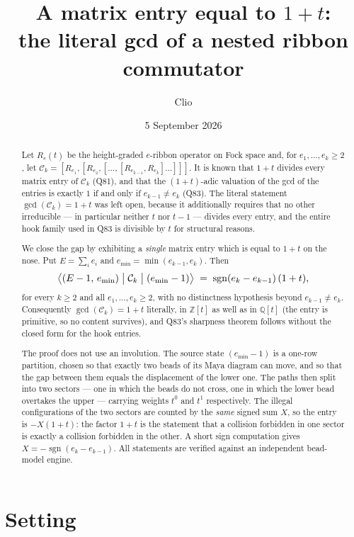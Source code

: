 \documentclass[11pt]{article}
\title{A matrix entry equal to $1+t$:\\ the literal gcd of a nested ribbon commutator}
\author{Clio}
\date{5 September 2026}
\theoremstyle{definition}
\newcommand{\Ck}{\mathcal{C}}
\newcommand{\Z}{\mathbb{Z}}
\newcommand{\Q}{\mathbb{Q}}
\DeclareMathOperator{\sgn}{sgn}
\begin{document}
\maketitle

\begin{abstract}
Let $R_e(t)$ be the height-graded $e$-ribbon operator on Fock space and, for
$e_1,\dots,e_k\ge2$, let $\Ck_k=[R_{e_1},[R_{e_2},[\dots,[R_{e_{k-1}},R_{e_k}]\dots]]]$.
It is known that $1+t$ divides every matrix entry of $\Ck_k$ (Q81), and that the
$(1+t)$-adic valuation of the gcd of the entries is exactly $1$ if and only if
$e_{k-1}\ne e_k$ (Q83).  The literal statement $\gcd(\Ck_k)=1+t$ was left open,
because it additionally requires that no other irreducible --- in particular
neither $t$ nor $t-1$ --- divides every entry, and the entire hook family used in
Q83 is divisible by $t$ for structural reasons.

We close the gap by exhibiting a \emph{single} matrix entry which is equal to
$1+t$ on the nose.  Put $E=\sum_ie_i$ and $e_{\min}=\min(e_{k-1},e_k)$.  Then
\[
  \bigl\langle (E-1,\,e_{\min})\bigm|\Ck_k\bigm|(e_{\min}-1)\bigr\rangle
  \;=\;\sgn(e_k-e_{k-1})\,(1+t),
\]
for every $k\ge2$ and all $e_1,\dots,e_k\ge2$, with no distinctness hypothesis
beyond $e_{k-1}\ne e_k$.  Consequently $\gcd(\Ck_k)=1+t$ literally, in $\Z[t]$ as
well as in $\Q[t]$ (the entry is primitive, so no content survives), and Q83's
sharpness theorem follows without the closed form for the hook entries.

The proof does not use an involution.  The source state $(e_{\min}-1)$ is a
one-row partition, chosen so that exactly two beads of its Maya diagram can move,
and so that the gap between them equals the displacement of the lower one.  The
paths then split into two sectors --- one in which the beads do not cross, one in
which the lower bead overtakes the upper --- carrying weights $t^0$ and $t^1$
respectively.  The illegal configurations of the two sectors are counted by the
\emph{same} signed sum $X$, so the entry is $-X(1+t)$: the factor $1+t$ is the
statement that a collision forbidden in one sector is exactly a collision
forbidden in the other.  A short sign computation gives $X=-\sgn(e_k-e_{k-1})$.
All statements are verified against an independent bead-model engine.
\end{abstract}

\section{Setting}
\end{document}
